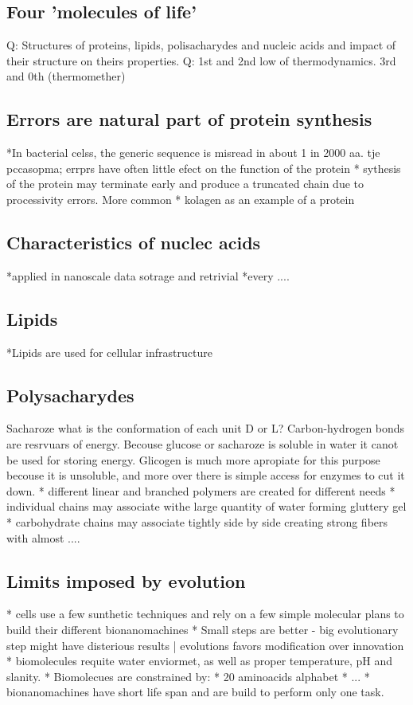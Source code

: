 \documentclass{article}
\begin{document}
\subsection{Four 'molecules of life'} 
Q: Structures of proteins, lipids, polisacharydes and nucleic acids and impact of their structure on theirs
properties.
Q: 1st and 2nd low of thermodynamics. 3rd and 0th (thermomether)

\subsection{Errors are natural part of protein synthesis}
*In bacterial celss, the generic sequence is misread in about 1 in 2000 aa. tje pccasopma; errprs have often
little efect on the function of the protein
* sythesis of the protein may terminate early and produce a truncated chain due to processivity errors. More
common
* kolagen as an example of a protein

\subsection{Characteristics of nuclec acids}
*applied in nanoscale data sotrage and retrivial
*every ....

\subsection{Lipids}
*Lipids are used for cellular infrastructure

\subsection{Polysacharydes}
Sacharoze what is the conformation of each unit D or L?
Carbon-hydrogen bonds are resrvuars of energy. Becouse glucose or sacharoze is soluble in water it canot be
used for storing energy. Glicogen is much more apropiate for this purpose becouse it is unsoluble, and more
over there is simple access for enzymes to cut it down. 
* different linear and branched polymers are created for different needs
* individual chains may associate withe large quantity of water forming gluttery gel
* carbohydrate chains may associate tightly side by side creating strong fibers with almost ....

\subsection{Limits imposed by evolution}
* cells use a few sunthetic techniques and rely on a few simple molecular plans to build their different
bionanomachines
* Small steps are better - big evolutionary step might have disterious results | evolutions favors
modification over innovation
* biomolecules requite water enviormet, as well as proper temperature, pH and slanity.
* Biomolecues are constrained by:
	* 20 aminoacids alphabet 
	* ...
* bionanomachines have short life span and are build to perform only one task.
\end{document}
